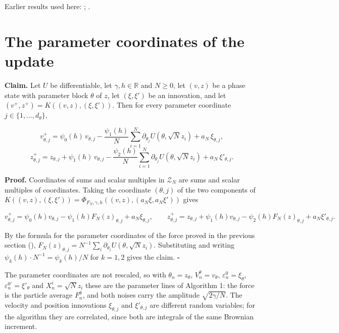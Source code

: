 \documentclass[11pt,a4paper]{article}
\begin{document}
Earlier results used here: \cite[Section~3.1.1]{LangevinLean2026IPLA}; \cite[Section~3.12.2]{LangevinLean2026Kinetic}.

\section{\texorpdfstring{The parameter coordinates of the update}{The parameter coordinates of the update}}


\textbf{Claim.} Let \(U\) be differentiable, let \(\gamma,h\in\mathbb R\) and \(N\ge0\), let \((v,z)\) be a phase state with parameter block \(\theta\) of \(z\), let \((\xi,\xi')\) be an innovation, and let \((v^+,z^+)=K((v,z),(\xi,\xi'))\). Then for every parameter coordinate \(j\in\{1,\dots,d_\theta\}\),


\[v^+_{\theta,j}=\psi_0(h)\,v_{\theta,j}-\frac{\psi_1(h)}N\sum_{i=1}^N\partial_{\theta_j}U(\theta,\sqrt Nz_i)+a_N\,\xi_{\theta,j},\]
\[z^+_{\theta,j}=z_{\theta,j}+\psi_1(h)\,v_{\theta,j}-\frac{\psi_2(h)}N\sum_{i=1}^N\partial_{\theta_j}U(\theta,\sqrt Nz_i)+a_N\,\xi'_{\theta,j}.\]


\textbf{Proof.} Coordinates of sums and scalar multiples in \(\mathcal Z_N\) are sums and scalar multiples of coordinates. Taking the coordinate \((\theta,j)\) of the two components of \(K((v,z),(\xi,\xi'))=\Phi_{F_N,\gamma,h}((v,z),(a_N\xi,a_N\xi'))\) gives


\[v^+_{\theta,j}=\psi_0(h)v_{\theta,j}-\psi_1(h)F_N(z)_{\theta,j}+a_N\xi_{\theta,j},\qquad z^+_{\theta,j}=z_{\theta,j}+\psi_1(h)v_{\theta,j}-\psi_2(h)F_N(z)_{\theta,j}+a_N\xi'_{\theta,j}.\]


By the formula for the parameter coordinates of the force proved in the previous section (\cite[Section~3.1.4]{LangevinLean2026KIPLMC}), \(F_N(z)_{\theta,j}=N^{-1}\sum_i\partial_{\theta_j}U(\theta,\sqrt Nz_i)\). Substituting and writing \(\psi_k(h)\cdot N^{-1}=\psi_k(h)/N\) for \(k=1,2\) gives the claim. \(\square\)




The parameter coordinates are not rescaled, so with \(\theta_n=z_\theta\), \(V^\theta_n=v_\theta\), \(\varepsilon^0_n=\xi_\theta\), \(\varepsilon^{0\prime}_n=\xi'_\theta\) and \(X^i_n=\sqrt Nz_i\) these are the parameter lines of Algorithm 1: the force is the particle average \(F^\theta_n\), and both noises carry the amplitude \(\sqrt{2\gamma/N}\). The velocity and position innovations \(\xi_{\theta,j}\) and \(\xi'_{\theta,j}\) are different random variables; for the algorithm they are correlated, since both are integrals of the same Brownian increment.
\end{document}
